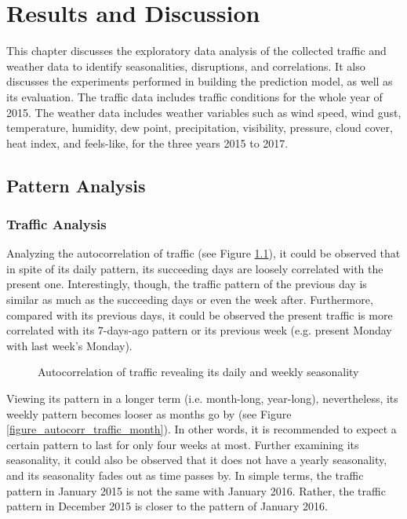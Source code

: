 \chapter{Results and Discussion}

This chapter discusses the exploratory data analysis of the collected traffic and weather data to identify seasonalities, disruptions, and correlations. It also discusses the experiments performed in building the prediction model, as well as its evaluation. The traffic data includes traffic conditions for the whole year of 2015. The weather data includes weather variables such as wind speed, wind gust, temperature, humidity, dew point, precipitation, visibility, pressure, cloud cover, heat index, and feels-like, for  the three years 2015 to 2017.

\section{Pattern Analysis}
\subsection{Traffic Analysis}

Analyzing the autocorrelation of traffic (see Figure \ref{figure_autocorr_week}), it could be observed that in spite of its daily pattern, its succeeding days are loosely correlated with the present one. Interestingly, though, the traffic pattern of the previous day is similar as much as the succeeding days or even the week after. Furthermore, compared with its previous days, it could be observed the present traffic is more correlated with its 7-days-ago pattern or its previous week (e.g. present Monday with last week's Monday).


\begin{figure}
  \centering
  \captionsetup{justification=centering}
  \caption{Autocorrelation of traffic revealing its daily and weekly seasonality}
  \label{figure_autocorr_week}
\end{figure}


\label{figure_autocorr_week}

Viewing its pattern in a longer term (i.e. month-long, year-long), nevertheless, its weekly pattern becomes looser as months go by (see Figure \ref{figure_autocorr_traffic_month}). In other words, it is recommended to expect a certain pattern to last for only four weeks at most. Further examining its seasonality, it could also be observed that it does not have a yearly seasonality, and its seasonality fades out as time passes by. In simple terms, the traffic pattern in January 2015 is not the same with January 2016. Rather, the traffic pattern in December 2015 is closer to the pattern of January 2016.


